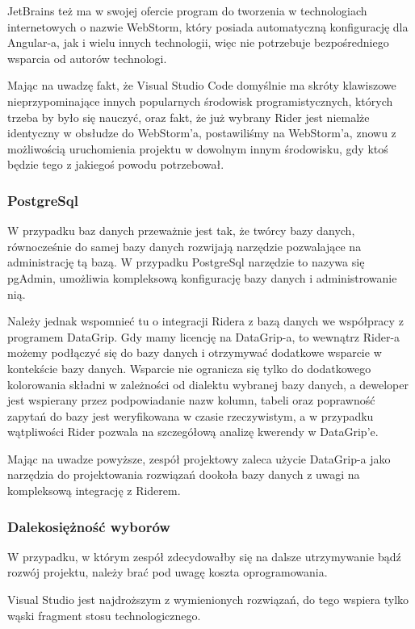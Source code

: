 JetBrains też ma w swojej ofercie program do tworzenia w technologiach internetowych o nazwie WebStorm, który posiada automatyczną konfigurację dla Angular-a, jak i wielu innych technologii, więc nie potrzebuje bezpośredniego wsparcia od autorów technologi.

Mając na uwadzę fakt, że Visual Studio Code domyślnie ma skróty klawiszowe nieprzypominające innych popularnych środowisk programistycznych, których trzeba by było się nauczyć, oraz fakt, że już wybrany Rider jest niemalże identyczny w obsłudze do WebStorm'a, postawiliśmy na WebStorm'a, znowu z możliwością uruchomienia projektu w dowolnym innym środowisku, gdy ktoś będzie tego z jakiegoś powodu potrzebował.

\subsubsection{PostgreSql}
W przypadku baz danych przeważnie jest tak, że twórcy bazy danych, równocześnie do samej bazy danych rozwijają narzędzie pozwalające na administrację tą bazą.
W przypadku PostgreSql narzędzie to nazywa się pgAdmin, umożliwia kompleksową konfigurację bazy danych i administrowanie nią.

Należy jednak wspomnieć tu o integracji Ridera z bazą danych we współpracy z programem DataGrip.
Gdy mamy licencję na DataGrip-a, to wewnątrz Rider-a możemy podłączyć się do bazy danych i otrzymywać dodatkowe wsparcie w kontekście bazy danych.
Wsparcie nie ogranicza się tylko do dodatkowego kolorowania składni w zależności od dialektu wybranej bazy danych, a deweloper jest wspierany przez podpowiadanie nazw kolumn, tabeli oraz poprawność zapytań do bazy jest  weryfikowana w czasie rzeczywistym, a w przypadku wątpliwości Rider pozwala na szczegółową analizę kwerendy w DataGrip'e.

Mając na uwadze powyższe, zespół projektowy zaleca użycie DataGrip-a jako narzędzia do projektowania rozwiązań dookoła bazy danych z uwagi na kompleksową integrację z Riderem.

\subsubsection{Dalekosiężność wyborów}
W przypadku, w którym zespół zdecydowałby się na dalsze utrzymywanie bądź rozwój projektu, należy brać pod uwagę koszta oprogramowania.

Visual Studio jest najdroższym z wymienionych rozwiązań, do tego wspiera tylko wąski fragment stosu technologicznego.

